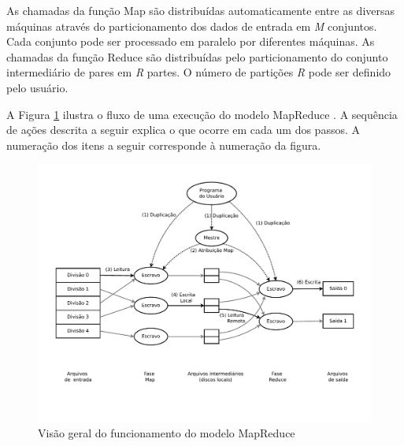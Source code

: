 As chamadas da função Map são distribuídas automaticamente entre as diversas máquinas através do particionamento dos dados de entrada em \textit{M} conjuntos. Cada conjunto pode ser processado em paralelo por diferentes máquinas. As chamadas da função Reduce são distribuídas pelo particionamento do conjunto intermediário de pares em \textit{R} partes. O número de partições \textit{R} pode ser definido pelo usuário.

A Figura \ref{fig:MapReduceoverview} ilustra o fluxo de uma execução do modelo MapReduce \cite{Dean:2008}. A sequência de ações descrita a seguir explica o que ocorre em cada um dos passos. A numeração dos itens a seguir corresponde à numeração da figura.

 \begin{figure}[!htb]
 \centering
\includegraphics[trim=0cm 2cm 0cm 1cm, width=\textwidth]{figuras/MapReduceOverflow.pdf}
\caption{Visão geral do funcionamento do modelo MapReduce}
\label{fig:MapReduceoverview}
\end{figure}

